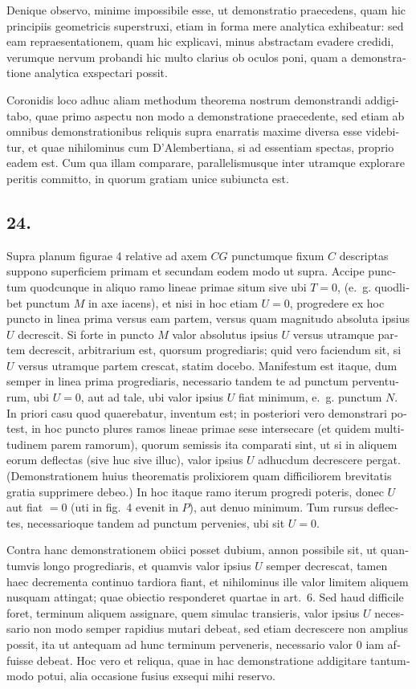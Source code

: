 \documentclass[12pt,a4paper]{article}
\begin{document}
\begin{otherlanguage}{latin}
Denique observo, minime impossibile esse, ut demonstratio praecedens, quam hic principiis geometricis superstruxi, etiam in forma mere analytica exhibeatur: sed eam repraesentationem, quam hic explicavi, minus abstractam evadere credidi, verumque nervum probandi hic multo clarius ob oculos poni, quam a demonstratione analytica exspectari possit.

Coronidis loco adhuc aliam methodum theorema nostrum demonstrandi addigitabo, quae primo aspectu non modo a demonstratione praecedente, sed etiam ab omnibus demonstrationibus reliquis supra enarratis maxime diversa esse videbitur, et quae nihilominus cum D'Alembertiana, si ad essentiam spectas, proprio eadem est. Cum qua illam comparare, parallelismusque inter utramque explorare peritis committo, in quorum gratiam unice subiuncta est.

\subsection*{24.}
Supra planum figurae 4 relative ad axem $CG$ punctumque fixum $C$ descriptas suppono superficiem primam et secundam eodem modo ut supra. Accipe punctum quodcunque in aliquo ramo lineae primae situm sive ubi $T=0$, (e.~g. quodlibet punctum $M$ in axe iacens), et nisi in hoc etiam $U=0$, progredere ex hoc puncto in linea prima versus eam partem, versus quam magnitudo absoluta ipsius $U$ decrescit. Si forte in puncto $M$ valor absolutus ipsius $U$ versus utramque partem decrescit, arbitrarium est, quorsum progrediaris; quid vero faciendum sit, si $U$ versus utramque partem crescat, statim docebo. Manifestum est itaque, dum semper in linea prima progrediaris, necessario tandem te ad punctum perventurum, ubi $U=0$, aut ad tale, ubi valor ipsius $U$ fiat minimum, e.~g. punctum $N$. In priori casu quod quaerebatur, inventum est; in posteriori vero demonstrari potest, in hoc puncto plures ramos lineae primae sese intersecare (et quidem multitudinem parem ramorum), quorum semissis ita comparati sint, ut si in aliquem eorum deflectas (sive huc sive illuc), valor ipsius $U$ adhucdum decrescere pergat. (Demonstrationem huius theorematis prolixiorem quam difficiliorem brevitatis gratia supprimere debeo.) In hoc itaque ramo iterum progredi poteris, donec $U$ aut fiat $=0$ (uti in fig.~4 evenit in $P$), aut denuo minimum. Tum rursus deflectes, necessarioque tandem ad punctum pervenies, ubi sit $U=0$.

Contra hanc demonstrationem obiici posset dubium, annon possibile sit, ut quantumvis longo progrediaris, et quamvis valor ipsius $U$ semper decrescat, tamen haec decrementa continuo tardiora fiant, et nihilominus ille valor limitem aliquem nusquam attingat; quae obiectio responderet quartae in art.~6. Sed haud difficile foret, terminum aliquem assignare, quem simulac transieris, valor ipsius $U$ necessario non modo semper rapidius mutari debeat, sed etiam decrescere non amplius possit, ita ut antequam ad hunc terminum perveneris, necessario valor $0$ iam affuisse debeat. Hoc vero et reliqua, quae in hac demonstratione addigitare tantummodo potui, alia occasione fusius exsequi mihi reservo.


\end{otherlanguage}
\end{document}
